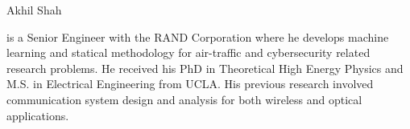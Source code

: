 \documentclass[conference]{IEEEtran}
\begin{document}
 \begin{IEEEbiography}{Akhil Shah}

is a Senior Engineer with the RAND Corporation where he develops machine learning and statical methodology for air-traffic and cybersecurity related research problems.  He received his PhD in Theoretical High Energy Physics and M.S. in Electrical Engineering from UCLA.  His previous research involved communication system design and analysis for both wireless and optical applications.  
 \end{IEEEbiography}



\end{document}
